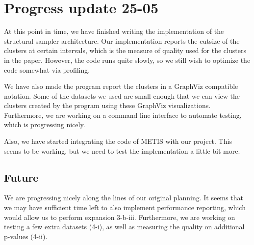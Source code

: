 \documentclass[a4paper,11pt]{article}
\begin{document}
\pagebreak
\section{Progress update 25-05}
At this point in time, we have finished writing the implementation of the structural sampler architecture. Our implementation reports the cutsize of the clusters at certain intervals, which is the measure of quality used for the clusters in the paper. However, the code runs quite slowly, so we still wish to optimize the code somewhat via profiling. 

We have also made the program report the clusters in a GraphViz compatible notation. Some of the datasets we used are small enough that we can view the clusters created by the program using these GraphViz visualizations. Furthermore, we are working on a command line interface to automate testing, which is progressing nicely.

Also, we have started integrating the code of METIS with our project. This seems to be working, but we need to test the implementation a little bit more.

\subsection{Future}
We are progressing nicely along the lines of our original planning. It seems that we may have sufficient time left to also implement performance reporting, which would allow us to perform expansion 3-b-iii. Furthermore, we are working on testing a few extra datasets (4-i), as well as measuring the quality on additional p-values (4-ii).
\end{document}
